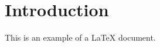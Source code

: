 \documentclass{article}
\begin{document}
\section{Introduction}
This is an example of a LaTeX document.
\end{document}
